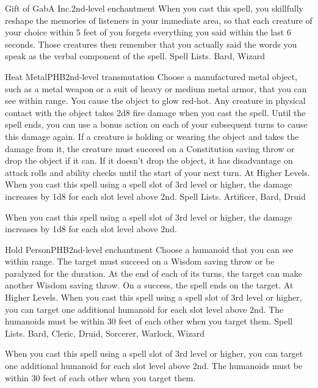 \begin{spell}{Gift of Gab}{A Inc.}{2nd-level enchantment}
{
}
When you cast this spell, you skillfully reshape the memories of listeners in your immediate area, so that each creature of your choice within 5 feet of you forgets everything you said within the last 6 seconds. Those creatures then remember that you actually said the words you speak as the verbal component of the spell.
Spell Lists. Bard, Wizard
\end{spell}

\begin{spell}{Heat Metal}{PHB}{2nd-level transmutation}
{
}
Choose a manufactured metal object, such as a metal weapon or a suit of heavy or medium metal armor, that you can see within range. You cause the object to glow red-hot. Any creature in physical contact with the object takes 2d8 fire damage when you cast the spell. Until the spell ends, you can use a bonus action on each of your subsequent turns to cause this damage again.
If a creature is holding or wearing the object and takes the damage from it, the creature must succeed on a Constitution saving throw or drop the object if it can. If it doesn’t drop the object, it has disadvantage on attack rolls and ability checks until the start of your next turn.
At Higher Levels. When you cast this spell using a spell slot of 3rd level or higher, the damage increases by 1d8 for each slot level above 2nd.
Spell Lists. Artificer, Bard, Druid

 When you cast this spell using a spell slot of 3rd level or higher, the damage increases by 1d8 for each slot level above 2nd.
\end{spell}

\begin{spell}{Hold Person}{PHB}{2nd-level enchantment}
{
}
Choose a humanoid that you can see within range. The target must succeed on a Wisdom saving throw or be paralyzed for the duration. At the end of each of its turns, the target can make another Wisdom saving throw. On a success, the spell ends on the target.
At Higher Levels. When you cast this spell using a spell slot of 3rd level or higher, you can target one additional humanoid for each slot level above 2nd. The humanoids must be within 30 feet of each other when you target them.
Spell Lists. Bard, Cleric, Druid, Sorcerer, Warlock, Wizard

 When you cast this spell using a spell slot of 3rd level or higher, you can target one additional humanoid for each slot level above 2nd. The humanoids must be within 30 feet of each other when you target them.
\end{spell}

